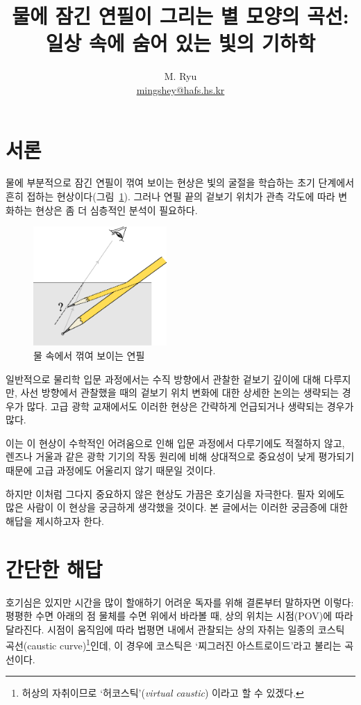 \documentclass[twocolumn]{article}
\title{물에 잠긴 연필이 그리는 별 모양의 곡선:\\ 일상 속에 숨어 있는 빛의 기하학}
\author{M. Ryu \\ {\href{mailto:mingshey@hafs.hs.kr}{mingshey@hafs.hs.kr}}}
\begin{document}
\maketitle
\renewcommand{\figurename}{그림}
\section{서론}

물에 부분적으로 잠긴 연필이 꺾여 보이는 현상은 빛의 굴절을 학습하는 초기 단계에서 흔히 접하는 현상이다(\figurename\ \ref{fig:pencil}). 그러나 연필 끝의 겉보기 위치가 관측 각도에 따라 변화하는 현상은 좀 더 심층적인 분석이 필요하다. 

\begin{figure}[ht]
	\centering
	\includegraphics[width=2in]{figs/g164.eps}
	\caption{물 속에서 꺾여 보이는 연필}
	\label{fig:pencil}
\end{figure}

일반적으로 물리학 입문 과정에서는 수직 방향에서 관찰한 겉보기 깊이에 대해 다루지만, 사선 방향에서 관찰했을 때의 겉보기 위치 변화에 대한 상세한 논의는 생략되는 경우가 많다. 고급 광학 교재에서도 이러한 현상은 간략하게 언급되거나 생략되는 경우가 많다. 

이는 이 현상이 수학적인 어려움으로 인해 입문 과정에서 다루기에도 적절하지 않고, 렌즈나 거울과 같은 광학 기기의 작동 원리에 비해 상대적으로 중요성이 낮게 평가되기 때문에 고급 과정에도 어울리지 않기 때문일 것이다. 

하지만 이처럼 그다지 중요하지 않은 현상도 가끔은 호기심을 자극한다. 필자 외에도 많은 사람이 이 현상을 궁금하게 생각했을 것이다. 본 글에서는 이러한 궁금증에 대한 해답을 제시하고자 한다.


\section{간단한 해답}

호기심은 있지만 시간을 많이 할애하기 어려운 독자를 위해 결론부터 말하자면 이렇다:  
평평한 수면 아래의 점 물체를 수면 위에서 바라볼 때, 상의 위치는 시점(POV)에 따라 달라진다. 
시점이 움직임에 따라 법평면 내에서 관찰되는 상의 자취는 일종의  코스틱 곡선(caustic curve)\footnote{허상의 
자취이므로 `허코스틱'(\emph{virtual caustic}) 이라고 할 수 있겠다.}인데, 이 경우에 
코스틱은 `찌그러진 아스트로이드'라고 불리는 곡선이다.
	
\end{document}
